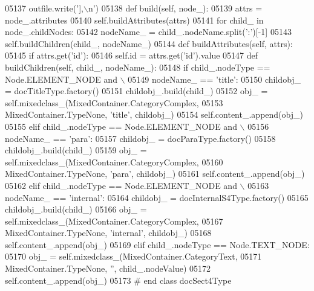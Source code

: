 \begin{DoxyCode}
{{{{{{{{{{{{{{{{{{{{{{{{{{{{{{{{{{{{{{{{{{{{{{{{{{{{{{{{{{{{{{{{{{{{{{{{{{{{{{{{{{{{{{{{{{{{{{{{{{{{{{{{{{{{{{{{{{{{{{{{{{{{{{{{{{{{{{{{{{{{{{{{{{{{{{{{{{{{{{{{{{{{{{{{{{{{{{{{{{{{{{{{{{{{{{{{{{{{{{{{{{{{{{{{{{{{{{{{{{{{{{{{{{{{{{{{{{{{{{{{{{{{{{{{{{{{{{{{{{{{{{{{{{{{{{{{{{{{{{{{{{{{{{{{{{{{{{{{{{{{{{{{{{{{{{{{{{{{{{{{{{{{{{{{{{{{{{{{05137         outfile.write(\textcolor{stringliteral}{'],\(\backslash\)n'})
05138     \textcolor{keyword}{def }build(self, node\_):
05139         attrs = node\_.attributes
05140         self.buildAttributes(attrs)
05141         \textcolor{keywordflow}{for} child\_ \textcolor{keywordflow}{in} node\_.childNodes:
05142             nodeName\_ = child\_.nodeName.split(\textcolor{stringliteral}{':'})[-1]
05143             self.buildChildren(child\_, nodeName\_)
05144     \textcolor{keyword}{def }buildAttributes(self, attrs):
05145         \textcolor{keywordflow}{if} attrs.get(\textcolor{stringliteral}{'id'}):
05146             self.id = attrs.get(\textcolor{stringliteral}{'id'}).value
05147     \textcolor{keyword}{def }buildChildren(self, child\_, nodeName\_):
05148         \textcolor{keywordflow}{if} child\_.nodeType == Node.ELEMENT\_NODE \textcolor{keywordflow}{and} \(\backslash\)
05149             nodeName\_ == \textcolor{stringliteral}{'title'}:
05150             childobj\_ = docTitleType.factory()
05151             childobj\_.build(child\_)
05152             obj\_ = self.mixedclass_(MixedContainer.CategoryComplex,
05153                 MixedContainer.TypeNone, \textcolor{stringliteral}{'title'}, childobj\_)
05154             self.content\_.append(obj\_)
05155         \textcolor{keywordflow}{elif} child\_.nodeType == Node.ELEMENT\_NODE \textcolor{keywordflow}{and} \(\backslash\)
05156             nodeName\_ == \textcolor{stringliteral}{'para'}:
05157             childobj\_ = docParaType.factory()
05158             childobj\_.build(child\_)
05159             obj\_ = self.mixedclass_(MixedContainer.CategoryComplex,
05160                 MixedContainer.TypeNone, \textcolor{stringliteral}{'para'}, childobj\_)
05161             self.content\_.append(obj\_)
05162         \textcolor{keywordflow}{elif} child\_.nodeType == Node.ELEMENT\_NODE \textcolor{keywordflow}{and} \(\backslash\)
05163             nodeName\_ == \textcolor{stringliteral}{'internal'}:
05164             childobj\_ = docInternalS4Type.factory()
05165             childobj\_.build(child\_)
05166             obj\_ = self.mixedclass_(MixedContainer.CategoryComplex,
05167                 MixedContainer.TypeNone, \textcolor{stringliteral}{'internal'}, childobj\_)
05168             self.content\_.append(obj\_)
05169         \textcolor{keywordflow}{elif} child\_.nodeType == Node.TEXT\_NODE:
05170             obj\_ = self.mixedclass_(MixedContainer.CategoryText,
05171                 MixedContainer.TypeNone, \textcolor{stringliteral}{''}, child\_.nodeValue)
05172             self.content\_.append(obj\_)
05173 \textcolor{comment}{# end class docSect4Type}
}}}}}}}}}}}}}}}}}}}}}}}}}}}}}}}}}}}}}}}}}}}}}}}}}}}}}}}}}}}}}}}}}}}}}}}}}}}}}}}}}}}}}}}}}}}}}}}}}}}}}}}}}}}}}}}}}}}}}}}}}}}}}}}}}}}}}}}}}}}}}}}}}}}}}}}}}}}}}}}}}}}}}}}}}}}}}}}}}}}}}}}}}}}}}}}}}}}}}}}}}}}}}}}}}}}}}}}}}}}}}}}}}}}}}}}}}}}}}}}}}}}}}}}}}}}}}}}}}}}}}}}}}}}}}}}}}}}}}}}}}}}}}}}}}}}}}}}}}}}}}}}}}}}}}}}}}}}}}}}}}}}}}}}}}}}}}}}}
\end{DoxyCode}

